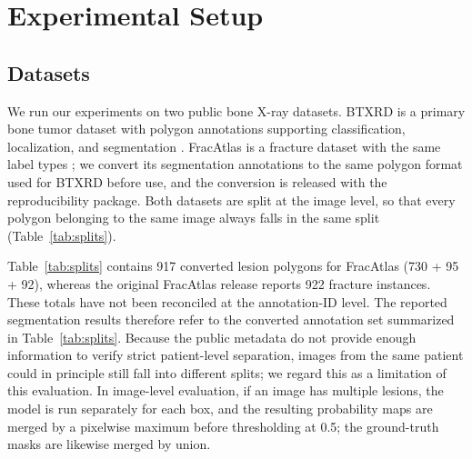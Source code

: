 \section{Experimental Setup}
\label{sec:experimental-setup}
\subsection{Datasets}
We run our experiments on two public bone X-ray datasets. BTXRD is a primary bone tumor dataset with polygon annotations supporting classification, localization, and segmentation \cite{b7}. FracAtlas is a fracture dataset with the same label types \cite{b8}; we convert its segmentation annotations to the same polygon format used for BTXRD before use, and the conversion is released with the reproducibility package. Both datasets are split at the image level, so that every polygon belonging to the same image always falls in the same split (Table~\ref{tab:splits}).

\begin{table}[t]
\caption{Image-level train / validation / test splits. Each lesion polygon is one promptable sample.}
\label{tab:splits}
\centering
\scriptsize
{}
\end{table}

Table~\ref{tab:splits} contains 917 converted lesion polygons for FracAtlas (730 + 95 + 92), whereas the original FracAtlas release reports 922 fracture instances. These totals have not been reconciled at the annotation-ID level. The reported segmentation results therefore refer to the converted annotation set summarized in Table~\ref{tab:splits}. Because the public metadata do not provide enough information to verify strict patient-level separation, images from the same patient could in principle still fall into different splits; we regard this as a limitation of this evaluation. In image-level evaluation, if an image has multiple lesions, the model is run separately for each box, and the resulting probability maps are merged by a pixelwise maximum before thresholding at 0.5; the ground-truth masks are likewise merged by union.

